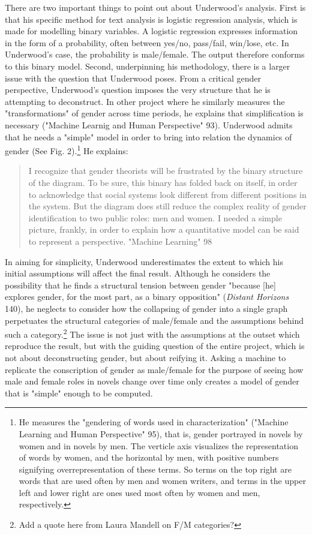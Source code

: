 \documentclass[11pt]{article}
\begin{document}
There are two important things to point out about Underwood's
analysis. First is that his specific method for text analysis is
logistic regression analysis, which is made for modelling binary
variables. A logistic regression expresses information in the form of
a probability, often between yes/no, pass/fail, win/lose, etc. In
Underwood's case, the probability is male/female. The output therefore
conforms to this binary model. Second, underpinning his methodology,
there is a larger issue with the question that Underwood poses. From a
critical gender perspective, Underwood's question imposes the very
structure that he is attempting to deconstruct. In other project where
he similarly measures the "transformations" of gender across time
periods, he explains that simplification is necessary ("Machine
Learnig and Human Perspective" 93). Underwood admits that he needs a
"simple" model in order to bring into relation the dynamics of gender
(See Fig. 2).\footnote{He measures the "gendering of words used in characterization"
("Machine Learning and Human Perspective" 95), that is, gender
portrayed in novels by women and in novels by men. The verticle axis
visualizes the representation of words by women, and the horizontal by
men, with positive numbers signifying overrepresentation of these
terms. So terms on the top right are words that are used often by men
and women writers, and terms in the upper left and lower right are
ones used most often by women and men, respectively.} He explains:
\begin{quote}
I recognize that gender theorists will be frustrated by the binary
structure of the diagram. To be sure, this binary has folded back on
itself, in order to acknowledge that social systems look different
from different positions in the system. But the diagram does still
reduce the complex reality of gender identification to two public
roles: men and women. I needed a simple picture, frankly, in order to
explain how a quantitative model can be said to represent a
perspective. "Machine Learning" 98
\end{quote}
In aiming for simplicity, Underwood underestimates the extent to which
his initial assumptions will affect the final result. Although he
considers the possibility that he finds a structural tension between
gender "because [he] explores gender, for the most part, as a binary
opposition" (\emph{Distant Horizons} 140), he neglects to consider how the
collapsing of gender into a single graph perpetuates the structural
categories of male/female and the assumptions behind such a
category.\footnote{Add a quote here from Laura Mandell on F/M categories?} The issue is not just with the assumptions at the
outset which reproduce the result, but with the guiding question of
the entire project, which is not about deconstructing gender, but
about reifying it. Asking a machine to replicate the conscription of
gender as male/female for the purpose of seeing how male and female
roles in novels change over time only creates a model of gender that
is "simple" enough to be computed.
\end{document}
